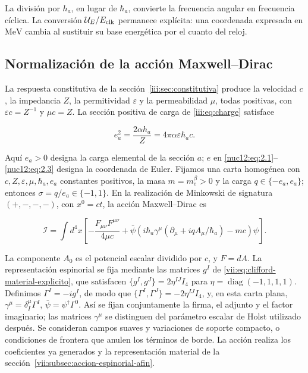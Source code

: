 La división por \(h_a\), en lugar de \(\hbar_a\), convierte la frecuencia angular en frecuencia cíclica. La conversión \(\mathcal U_E/E_{\rm clk}\) permanece explícita: una coordenada expresada en \(\mathrm{MeV}\) cambia al sustituir su base energética por el cuanto del reloj.

\subsection{Normalización de la acción Maxwell--Dirac}

La respuesta constitutiva de la sección~\ref{iii:sec:constitutiva} produce la velocidad \(c\), la impedancia \(Z\), la permitividad \(\varepsilon\) y la permeabilidad \(\mu\), todas positivas, con \(\varepsilon c=Z^{-1}\) y \(\mu c=Z\). La sección positiva de carga de \eqref{iii:eq:charge} satisface



\begin{equation}
e_a^2=\frac{2\alpha h_a}{Z}
=4\pi\alpha\varepsilon\hbar_a c .
\label{nuc12:eq:3.1}
\end{equation}



Aquí \(e_a>0\) designa la carga elemental de la sección \(a\); \(e\) en \eqref{nuc12:eq:2.1}--\eqref{nuc12:eq:2.3} designa la coordenada de Euler. Fijamos una carta homogénea con \(c,Z,\varepsilon,\mu,\hbar_a,e_a\) constantes positivos, la masa \(m=m_e^\beta>0\) y la carga \(q\in\{-e_a,e_a\}\); entonces \(\sigma=q/e_a\in\{-1,1\}\). En la realización de Minkowski de signatura \((+,-,-,-)\), con \(x^0=ct\), la acción Maxwell--Dirac es



\begin{equation}
\mathcal I=\int d^4x\left[
-\frac{F_{\mu\nu}F^{\mu\nu}}{4\mu c}
+\bar\psi\left(i\hbar_a\gamma^\mu
(\partial_\mu+iqA_\mu/\hbar_a)-mc\right)\psi
\right].
\label{nuc12:eq:3.2}
\end{equation}



La componente \(A_0\) es el potencial escalar dividido por \(c\), y \(F=dA\). La representación espinorial se fija mediante las matrices \(g^I\) de \eqref{vii:eq:clifford-material-explicito}, que satisfacen \(\{g^I,g^J\}=2\eta^{IJ}I_4\) para \(\eta=\operatorname{diag}(-1,1,1,1)\). Definimos \(\Gamma^I=-ig^I\), de modo que \(\{\Gamma^I,\Gamma^J\}=-2\eta^{IJ}I_4\), y, en esta carta plana, \(\gamma^\mu=\delta^\mu_I\Gamma^I\), \(\bar\psi=\psi^\dagger\Gamma^0\). Así se fijan conjuntamente la firma, el adjunto y el factor imaginario; las matrices \(\gamma^\mu\) se distinguen del parámetro escalar de Holst utilizado después. Se consideran campos suaves y variaciones de soporte compacto, o condiciones de frontera que anulen los términos de borde. La acción realiza los coeficientes ya generados y la representación material de la sección~\ref{vii:subsec:accion-espinorial-afin}.

